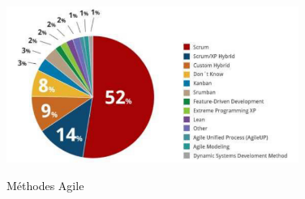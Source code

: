 \begin{itemize}
	\begin{figure}[!h]
		\centering
		{\includegraphics[width=0.85\textwidth]{D) IMAGES/agile.png}}
		\caption{Méthodes Agile}
		\label{Org}
	\end{figure}
	
\end{itemize} 

